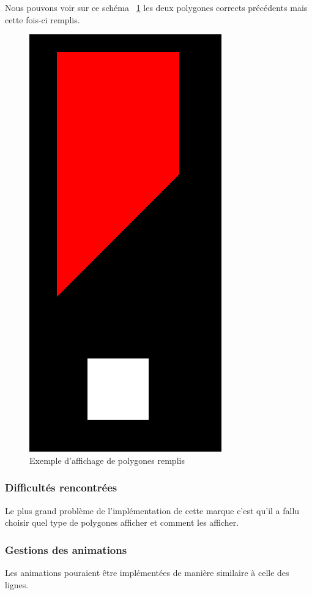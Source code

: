 \documentclass[12pt]{article}
\begin{document}
Nous pouvons voir sur ce schéma ~\ref{fig:capture_polygon_fill} les deux polygones corrects précédents mais cette fois-ci remplis.
\begin{figure}[htp]
  \centering
  \includegraphics[scale=0.5]{images/polygon_fill}
  \caption{Exemple d'affichage de polygones remplis}
  \label{fig:capture_polygon_fill}
\end{figure}

\subsubsection{Difficultés rencontrées}
Le plus grand problème de l'implémentation de cette marque c'est qu'il a fallu choisir quel type
de polygones afficher et comment les afficher.

\subsubsection{Gestions des animations}
Les animations pouraient être implémentées de manière similaire à celle des lignes.
\end{document}
